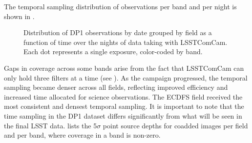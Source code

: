 The temporal sampling distribution of observations per band and per night is shown in .
\begin{figure}[htb!]
\caption{Distribution of DP1 observations by date grouped by field as a function of time over the \nnightscomcam nights of data taking with LSSTComCam.
Each dot represents a single  exposure, color-coded by band.}
\label{fig:target_fields_temporal_sampling}
\end{figure}
Gaps in coverage across some bands arise from the fact that \gls{LSSTComCam} can only hold three filters at a time (see ).
As the campaign progressed, the temporal sampling became denser across all fields, reflecting improved efficiency and increased time allocated for science observations.
The \gls{ECDFS} field received the most consistent and densest temporal sampling.
It is important to note that the time sampling in the \gls{DP1} dataset differs significantly from what will be seen in the final \gls{LSST} data.
 lists the  5$\sigma$ point source depths for coadded images per field and per band, where coverage in a band is non-zero.



